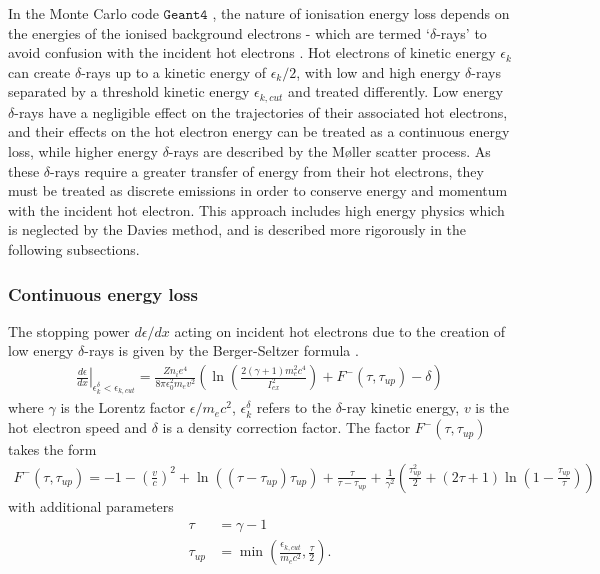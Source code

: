 \documentclass[12pt]{article}
\numberwithin{equation}{section}
\begin{document}
In the Monte Carlo code $\texttt{Geant4}$ \cite{code:geant4:2003, code:geant4:2006, code:geant4:2016}, the nature of ionisation energy loss depends on the energies of the ionised background electrons - which are termed `$\delta$-rays' to avoid confusion with the incident hot electrons \cite{code:geant4:physRefMan}. Hot electrons of kinetic energy $\epsilon_k$ can create $\delta$-rays up to a kinetic energy of $\epsilon_k/2$, with low and high energy $\delta$-rays separated by a threshold kinetic energy $\epsilon_{k,cut}$ and treated differently. Low energy $\delta$-rays have a negligible effect on the trajectories of their associated hot electrons, and their effects on the hot electron energy can be treated as a continuous energy loss, while higher energy $\delta$-rays are described by the M\o{}ller scatter process. As these $\delta$-rays require a greater transfer of energy from their hot electrons, they must be treated as discrete emissions in order to conserve energy and momentum with the incident hot electron. This approach includes high energy physics which is neglected by the Davies method, and is described more rigorously in the following subsections.

\subsubsection{Continuous energy loss} \label{sec:theory:coll:cont}

The stopping power $d\epsilon/dx$ acting on incident hot electrons due to the creation of low energy $\delta$-rays is given by the Berger-Seltzer formula \cite{theory:ionisation:continuousFull}.
%
\begin{align} \label{eq:ionisation:cont_stopping_power}
  \left.\frac{d\epsilon}{dx}\right|_{\epsilon^{\delta}_k < \epsilon_{k,cut}}
  =
  \frac{Zn_ie^4}{8\pi\epsilon_0^2m_ev^2}
  \left(
    \ln\left(\frac{2(\gamma+1)m_e^2c^4}{I_{ex}^2}\right)
    + F^{-}(\tau,\tau_{up})
    - \delta    
  \right)
\end{align}
%
where $\gamma$ is the Lorentz factor $\epsilon/m_ec^2$, $\epsilon_k^\delta$ refers to the $\delta$-ray kinetic energy, $v$ is the hot electron speed and $\delta$ is a density correction factor. The factor $F^-(\tau,\tau_{up})$ takes the form
%
\begin{align}
  F^-(\tau,\tau_{up}) = -1 -\left(\frac{v}{c}\right)^2 + \ln\left((\tau-\tau_{up})\tau_{up}\right) + \frac{\tau}{\tau-\tau_{up}} + \frac{1}{\gamma^2}\left(\frac{\tau_{up}^2}{2}+(2\tau+1)\ln\left(1-\frac{\tau_{up}}{\tau}\right)\right)
\end{align}
%
with additional parameters
%
\begin{align}  
  \tau &= \gamma - 1 \\
  \tau_{up} &= \min\left(\frac{\epsilon_{k,cut}}{m_ec^2}, \frac{\tau}{2}\right).
\end{align}
\end{document}
